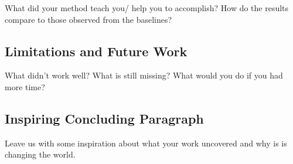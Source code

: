 \documentclass{article}
\begin{document}
What did your method teach you/ help you to accomplish? How do the results compare to those observed from the baselines?

\subsection{Limitations and Future Work}

What didn't work well? What is still missing? What would you do if you had more time?

\subsection{Inspiring Concluding Paragraph}

Leave us with some inspiration about what your work uncovered and why is is changing the world. 
\end{document}
